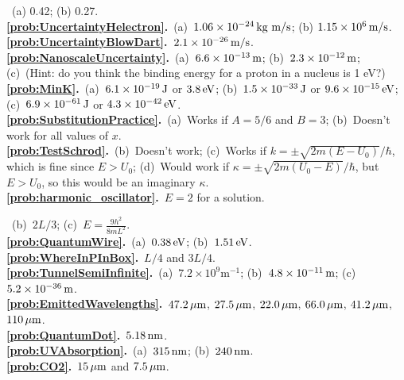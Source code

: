 \medskip


~(a) 0.42; (b) 0.27.\\
{\bf \ref{prob:UncertaintyHelectron}.}~(a)~$1.06 \times 10^{-24}\,\mbox{kg m/s}$; (b) $1.15 \times 10^6\,\mbox{m/s}$.\\
{\bf \ref{prob:UncertaintyBlowDart}.}~$2.1\times 10^{-26}\,\mbox{m/s}$.\\
{\bf \ref{prob:NanoscaleUncertainty}.}~(a)~$6.6\times 10^{-13}\,\mbox{m}$; (b)~$2.3\times 10^{-12}\,\mbox{m}$;
(c)~(Hint: do you think the binding energy for a proton in a nucleus is 1 eV?)\\
{\bf \ref{prob:MinK}.}~(a)~$6.1\times 10^{-19}\,\mbox{J}$ or $3.8\,\mbox{eV}$; (b)~$1.5\times 10^{-33}\,\mbox{J}$ or $9.6\times 10^{-15}\,\mbox{eV}$;
(c)~$6.9\times 10^{-61}\,\mbox{J}$ or $4.3\times 10^{-42}\,\mbox{eV}$.\\
{\bf \ref{prob:SubstitutionPractice}.}~(a)~Works if $A = 5/6$ and $B = 3$; (b)~Doesn't work for all values of $x$.\\
{\bf \ref{prob:TestSchrod}.}~(b)~Doesn't work; (c)~Works if $k = \pm \sqrt{2m(E-U_0)}/\hbar$, which is fine since $E > U_0$;
(d)~Would work if $\kappa = \pm \sqrt{2m(U_0-E)}/\hbar$, but $E > U_0$, so this would be an imaginary $\kappa$.\\
{\bf \ref{prob:harmonic_oscillator}.}~$E = 2$ for a solution.\\

 \medskip


~(b)~$2L/3$; (c)~$E=\frac{9h^2}{8mL^2}$.\\
{\bf \ref{prob:QuantumWire}.}~(a)~$0.38\,\mbox{eV}$; (b)~$1.51 \,\mbox{eV}$.\\
{\bf \ref{prob:WhereInPInBox}.}~$L/4$ and $3L/4$.\\
{\bf \ref{prob:TunnelSemiInfinite}.}~(a)~$7.2\times 10^9 $m$^{-1}$; (b)~$4.8\times 10^{-11}\,\mbox{m}$;
(c)~$5.2\times 10^{-36}\,\mbox{m}$.\\
{\bf \ref{prob:EmittedWavelengths}.}~$47.2\,\mbox{$\mu$m}$, 
$27.5\,\mbox{$\mu$m}$, $22.0\,\mbox{$\mu$m}$, $66.0\,\mbox{$\mu$m}$, 
$41.2\,\mbox{$\mu$m}$, $110\,\mbox{$\mu$m}$.\\
{\bf \ref{prob:QuantumDot}.}~$5.18\,\mbox{nm}$.\\
{\bf \ref{prob:UVAbsorption}.}~(a)~$315\,\mbox{nm}$; (b)~$240\,\mbox{nm}$.\\
{\bf \ref{prob:CO2}.}~$15\,\mbox{$\mu$m}$ and $7.5\,\mbox{$\mu$m}$.

